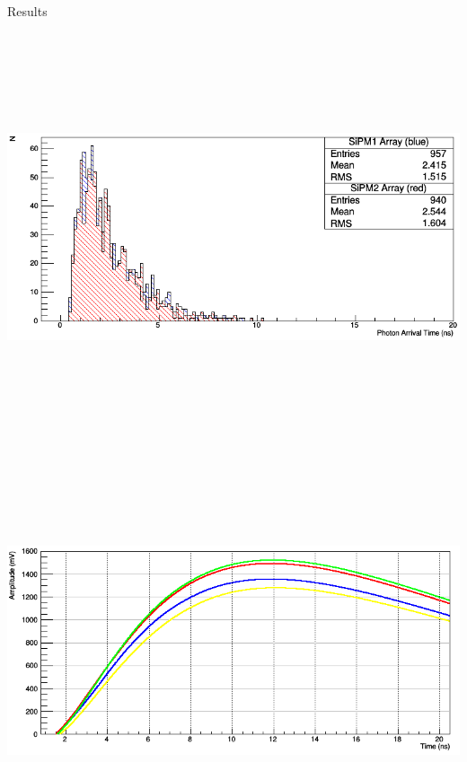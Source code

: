 \documentclass[final]{beamer}
\newlength{\onecolwid}
\newlength{\twocolwid}
\begin{document}
\begin{frame}[t]
\begin{columns}[t]
\begin{column}{\twocolwid}
\begin{columns}[t,totalwidth=\twocolwid]
\begin{column}{\onecolwid}
\begin{block}{Results}


\space
\space
\space
\includegraphics[height=12cm]{d3}
\newline
\includegraphics[height=12.15cm]{d2}


\end{block}
\end{column}
\end{columns}
\end{column}
\end{columns}
\end{frame}
\end{document}
